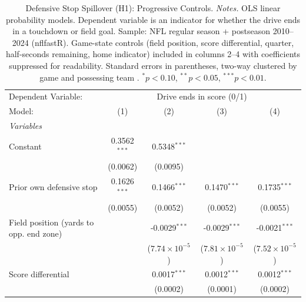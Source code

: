 
\begin{table}[htbp]
   \caption{\label{tab:h1prog} Defensive Stop Spillover (H1): Progressive Controls. \textit{Notes.} OLS linear probability models. Dependent variable is an indicator for whether the drive ends in a touchdown or field goal. Sample: NFL regular season + postseason 2010--2024 (nflfastR). Game-state controls (field position, score differential, quarter, half-seconds remaining, home indicator) included in columns 2--4 with coefficients suppressed for readability. Standard errors in parentheses, two-way clustered by game and possessing team \citep{cameron2011robust}. $^{*}p<0.10$, $^{**}p<0.05$, $^{***}p<0.01$.}
   \centering
   \begin{tabular}{lcccc}
      \tabularnewline \midrule \midrule
      Dependent Variable: & \multicolumn{4}{c}{Drive ends in score (0/1)}\\
      Model:                                  & (1)            & (2)                           & (3)                           & (4)\\  
      \midrule
      \emph{Variables}\\
      Constant                                & 0.3562$^{***}$ & 0.5348$^{***}$                &                               &   \\   
                                              & (0.0062)       & (0.0095)                      &                               &   \\   
      Prior own defensive stop                & 0.1626$^{***}$ & 0.1466$^{***}$                & 0.1470$^{***}$                & 0.1735$^{***}$\\   
                                              & (0.0055)       & (0.0052)                      & (0.0052)                      & (0.0055)\\   
      Field position (yards to opp. end zone) &                & -0.0029$^{***}$               & -0.0029$^{***}$               & -0.0021$^{***}$\\   
                                              &                & ($7.74\times 10^{-5}$)        & ($7.81\times 10^{-5}$)        & ($7.52\times 10^{-5}$)\\    
      Score differential                      &                & 0.0017$^{***}$                & 0.0012$^{***}$                & 0.0012$^{***}$\\   
                                              &                & (0.0002)                      & (0.0001)                      & (0.0002)\\   

\end{tabular}
\end{table}
